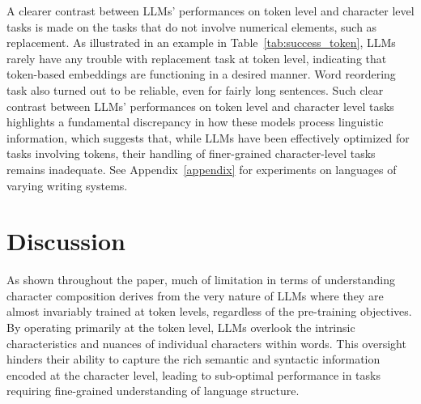 \documentclass{article}
\theoremstyle{plain}
\theoremstyle{definition}
\theoremstyle{remark}
\begin{document}
A clearer contrast between LLMs' performances on token level and character level tasks is made on the tasks that do not involve numerical elements, such as replacement. As illustrated in an example in Table~\ref{tab:success_token}, LLMs rarely have any trouble with replacement task at token level, indicating that token-based embeddings are functioning in a desired manner. Word reordering task also turned out to be reliable, even for fairly long sentences. Such clear contrast between LLMs' performances on token level and character level tasks highlights a fundamental discrepancy in how these models process linguistic information, which suggests that, while LLMs have been effectively optimized for tasks involving tokens, their handling of finer-grained character-level tasks remains inadequate. See Appendix~\ref{appendix} for experiments on languages of varying writing systems.



\section{Discussion}\label{sec:discuss}
As shown throughout the paper, much of limitation in terms of understanding character composition derives from the very nature of LLMs where they are almost invariably trained at token levels, regardless of the pre-training objectives. By operating primarily at the token level, LLMs overlook the intrinsic characteristics and nuances of individual characters within words. This oversight hinders their ability to capture the rich semantic and syntactic information encoded at the character level, leading to sub-optimal performance in tasks requiring fine-grained understanding of language structure. 
\end{document}
